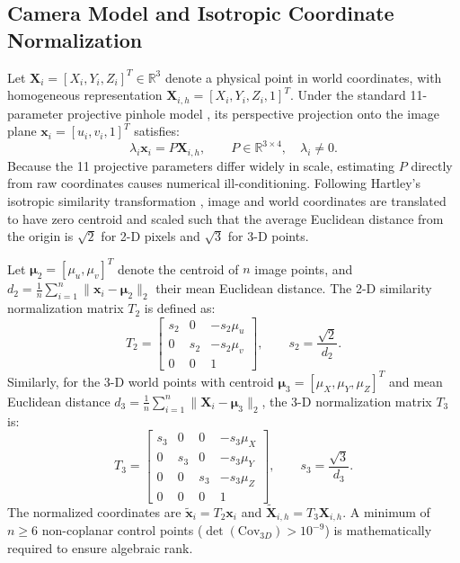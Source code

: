 \documentclass[a4paper,conference]{IEEEtran}
\newcommand{\R}{\mathbb{R}}
\newcommand{\X}{\mathbf{X}}
\newcommand{\x}{\mathbf{x}}
\begin{document}
\subsection{Camera Model and Isotropic Coordinate Normalization}
Let $\X_i = [X_i, Y_i, Z_i]^T \in \R^3$ denote a physical point in world coordinates, with homogeneous representation $\X_{i,h} = [X_i, Y_i, Z_i, 1]^T$. Under the standard 11-parameter projective pinhole model \cite{abdkarara}, its perspective projection onto the image plane $\x_i = [u_i, v_i, 1]^T$ satisfies:
\begin{equation}
  \lambda_i \x_i = P \X_{i,h}, \qquad P \in \R^{3 \times 4}, \quad \lambda_i \ne 0.
  \label{eq:camera}
\end{equation}
Because the 11 projective parameters differ widely in scale, estimating $P$ directly from raw coordinates causes numerical ill-conditioning. Following Hartley's isotropic similarity transformation \cite{hz}, image and world coordinates are translated to have zero centroid and scaled such that the average Euclidean distance from the origin is $\sqrt{2}$ for 2-D pixels and $\sqrt{3}$ for 3-D points.

Let $\boldsymbol{\mu}_2 = [\mu_u, \mu_v]^T$ denote the centroid of $n$ image points, and $d_2 = \frac{1}{n}\sum_{i=1}^n \|\x_i - \boldsymbol{\mu}_2\|_2$ their mean Euclidean distance. The 2-D similarity normalization matrix $T_2$ is defined as:
\begin{equation}
T_2 = \begin{bmatrix} s_2 & 0 & -s_2 \mu_u \\ 0 & s_2 & -s_2 \mu_v \\ 0 & 0 & 1 \end{bmatrix}, \qquad s_2 = \frac{\sqrt{2}}{d_2}.
\label{eq:t2}
\end{equation}
Similarly, for the 3-D world points with centroid $\boldsymbol{\mu}_3 = [\mu_X, \mu_Y, \mu_Z]^T$ and mean Euclidean distance $d_3 = \frac{1}{n}\sum_{i=1}^n \|\X_i - \boldsymbol{\mu}_3\|_2$, the 3-D normalization matrix $T_3$ is:
\begin{equation}
T_3 = \begin{bmatrix}
s_3 & 0 & 0 & -s_3 \mu_X \\
0 & s_3 & 0 & -s_3 \mu_Y \\
0 & 0 & s_3 & -s_3 \mu_Z \\
0 & 0 & 0 & 1
\end{bmatrix}, \qquad s_3 = \frac{\sqrt{3}}{d_3}.
\label{eq:t3}
\end{equation}
The normalized coordinates are $\tilde{\x}_i = T_2 \x_i$ and $\tilde{\X}_{i,h} = T_3 \X_{i,h}$. A minimum of $n \ge 6$ non-coplanar control points ($\det(\mathrm{Cov}_{3D}) > 10^{-9}$) is mathematically required to ensure algebraic rank.
\end{document}
